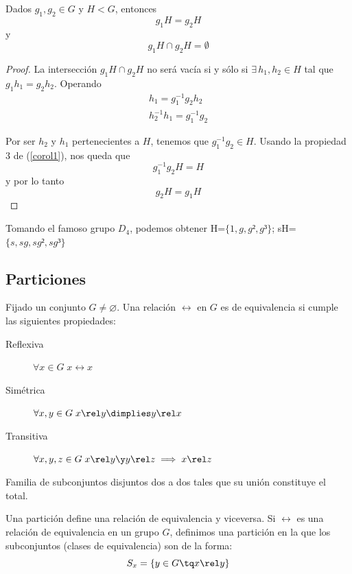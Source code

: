 \documentclass{apuntes}
\begin{document}
  \begin{prop}
   Dados $g_{1}, g_{2}\in G$ y $H<G$, entonces \[ g_{1}H=g_{2}H \] y \[g_{1}H\cap g_{2}H=\emptyset \]
  \end{prop}
  
  \begin{proof}
   La intersección $g_{1}H\cap g_{2}H$ no será vacía si y sólo si $\exists\, h_{1},h_{2} \in H$ tal que $g_{1}h_{1}=g_{2}h_{2}$. Operando 
   \begin{gather*}
   h_{1}=g_{1}^{-1}g_{2}h_{2} \\
   h_{2}^{-1}h_{1}=g_{1}^{-1}g_{2}
   \end{gather*}
   
   Por ser $h_2$ y $h_1$ pertenecientes a $H$, tenemos que $g_{1}^{-1}g_{2} \in H$. Usando la propiedad 3 de (\ref{corol1}), nos queda que
    \[ g_{1}^{-1}g_{2}H=H  \] y por lo tanto \[ g_{2}H=g_{1}H \]
  \end{proof}
  
  \begin{example}
   Tomando el famoso grupo $D_{4}$, podemos obtener H=$\{1,g,g²,g³\}$; sH=$\{s,sg,sg²,sg³\}$
  \end{example}
  
  
  
  \subsection{Particiones}

  \begin{defn}
   Fijado un conjunto $G\neq\varnothing$. Una relación $\rel$ en $G$ es de equivalencia si cumple las siguientes propiedades:
  
   \begin{description}   
    \item[Reflexiva] $\forall x\in G \;  x\rel x$
    \item[Simétrica] $\forall x,y \in G\;  x\rel y \dimplies y \rel x$
    \item[Transitiva] $\forall x,y,z \in G\;  x\rel y \y  y\rel z \implies x\rel z$
   \end{description}  
  \end{defn}
 
  \begin{defn}[Partición]
   Familia de subconjuntos disjuntos dos a dos tales que su unión constituye el total. 
  \end{defn}
  
  Una partición define una relación de equivalencia y viceversa. Si $\rel$ es una relación de equivalencia en un grupo $G$, 
  definimos una partición en la que los subconjuntos (clases de equivalencia) son de la forma: \[ S_{x}=\{y\in G \tq x\rel y\} \]
  
\end{document}
